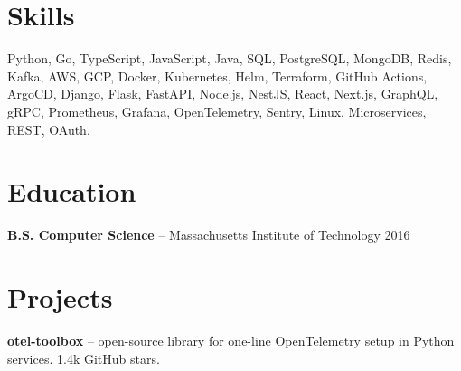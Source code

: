 \documentclass{article}
\begin{document}
\section*{Skills}
Python, Go, TypeScript, JavaScript, Java, SQL, PostgreSQL, MongoDB, Redis, Kafka,
AWS, GCP, Docker, Kubernetes, Helm, Terraform, GitHub Actions, ArgoCD,
Django, Flask, FastAPI, Node.js, NestJS, React, Next.js, GraphQL, gRPC,
Prometheus, Grafana, OpenTelemetry, Sentry, Linux, Microservices, REST, OAuth.

\section*{Education}
\textbf{B.S. Computer Science} -- Massachusetts Institute of Technology \hfill 2016

\section*{Projects}
\textbf{otel-toolbox} -- open-source library for one-line OpenTelemetry setup in Python services. 1.4k GitHub stars.
\end{document}
